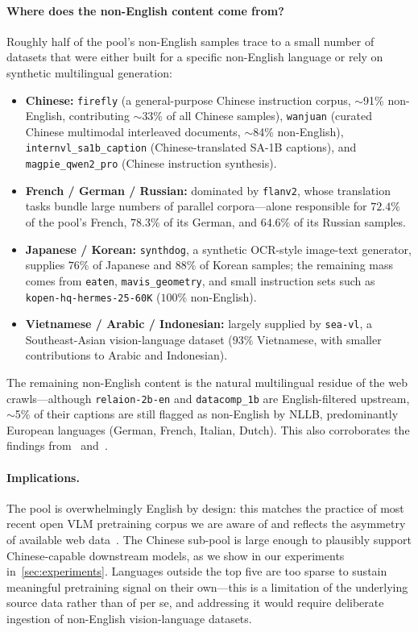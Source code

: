 \paragraph{Where does the non-English content come from?} Roughly half of the pool's non-English samples trace to a small number of datasets that were either built for a specific non-English language or rely on synthetic multilingual generation:
\begin{itemize}[leftmargin=15pt,topsep=2pt,itemsep=2pt]
  \item \textbf{Chinese:} \texttt{firefly} (a general-purpose Chinese instruction corpus, $\sim$91\% non-English, contributing $\sim$33\% of all Chinese samples), \texttt{wanjuan} (curated Chinese multimodal interleaved documents, $\sim$84\% non-English), \texttt{internvl\_sa1b\_caption} (Chinese-translated SA-1B captions), and \texttt{magpie\_qwen2\_pro} (Chinese instruction synthesis).
  \item \textbf{French / German / Russian:} dominated by \texttt{flanv2}, whose translation tasks bundle large numbers of parallel corpora---alone responsible for $72.4\%$ of the pool's French, $78.3\%$ of its German, and $64.6\%$ of its Russian samples.
  \item \textbf{Japanese / Korean:} \texttt{synthdog}, a synthetic OCR-style image-text generator, supplies $76\%$ of Japanese and $88\%$ of Korean samples; the remaining mass comes from \texttt{eaten}, \texttt{mavis\_geometry}, and small instruction sets such as \texttt{kopen-hq-hermes-25-60K} ($100\%$ non-English).
  \item \textbf{Vietnamese / Arabic / Indonesian:} largely supplied by \texttt{sea-vl}, a Southeast-Asian vision-language dataset ($93\%$ Vietnamese, with smaller contributions to Arabic and Indonesian).
\end{itemize}
The remaining non-English content is the natural multilingual residue of the web crawls---although \texttt{relaion-2b-en} and \texttt{datacomp\_1b} are English-filtered upstream, $\sim$5\% of their captions are still flagged as non-English by NLLB, predominantly European languages (German, French, Italian, Dutch). This also corroborates the findings from~\citet{nguyen2024multilingual} and~\citet{pouget2024no}.

\paragraph{Implications.} The pool is overwhelmingly English by design: this matches the practice of most recent open VLM pretraining corpus we are aware of and reflects the asymmetry of available web data~\citep{udandarao2024no,parashar2024neglected}. The Chinese sub-pool is large enough to plausibly support Chinese-capable downstream models, as we show in our experiments in~\cref{sec:experiments}. Languages outside the top five are too sparse to sustain meaningful pretraining signal on their own---this is a limitation of the underlying source data rather than of \dcvlm{} per se, and addressing it would require deliberate ingestion of non-English vision-language datasets.

